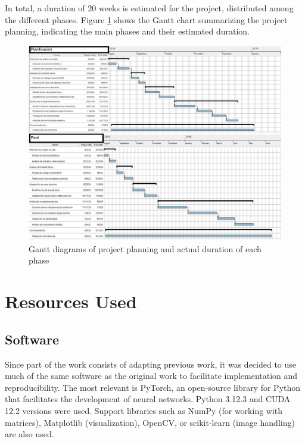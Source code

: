 In total, a duration of 20 weeks is estimated for the project, distributed among the different phases.
Figure \ref{fig:planificacion_proxecto} shows the Gantt chart summarizing the project planning, indicating the main phases and their estimated duration.

\begin{figure}[tbp]
    \centering
    \includegraphics[height=1\textwidth, angle=90]{imaxes/gants-1.png}
    \caption{Gantt diagrams of project planning and actual duration of each phase}
    \label{fig:planificacion_proxecto}
\end{figure}

\section{Resources Used}
\label{sec:Recursos utilizados}

\subsection{Software}
\label{subsec:Software}

Since part of the work consists of adapting previous work, 
it was decided to use much of the same software as the original work to facilitate implementation and reproducibility.
The most relevant is PyTorch, an open-source library for Python that facilitates the development of neural networks. Python 3.12.3 and CUDA 12.2 versions were used. Support libraries such as NumPy (for working with matrices), Matplotlib (visualization), OpenCV, or scikit-learn (image handling) are also used.

